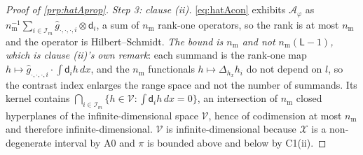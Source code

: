 \begin{proof}[Proof of \cref{prp:hatAprop}]
\emph{Step 3: clause (ii).} \eqref{eq:hatAcon} exhibits $\hat{\mathcal A}_\varphi$ as
$n_{\mathrm m}^{-1}\sum_{i\in\mathcal I_m}\hat g_{\cdot,\cdot,\cdot,i}\otimes\mathsf d_i$, a sum of
$n_{\mathrm m}$ rank-one operators, so the rank is at most $n_{\mathrm m}$ and the operator is
Hilbert--Schmidt. \emph{The bound is $n_{\mathrm m}$ and not $n_{\mathrm m}(\mathsf L-1)$, which is
clause \textup{(ii)}'s own remark}: each summand is the rank-one map
$h\mapsto\hat g_{\cdot,\cdot,\cdot,i}\cdot\int\mathsf d_ih\,dx$, and the $n_{\mathrm m}$ functionals
$h\mapsto\Delta_{h_x}h_i$ do not depend on $l$, so the contrast index enlarges the range space and not
the number of summands. Its kernel contains $\bigcap_{i\in\mathcal I_m}\{h\in\mathcal V:\int\mathsf d_ih\,dx=0\}$,
an intersection of $n_{\mathrm m}$ closed hyperplanes of the infinite-dimensional space $\mathcal V$,
hence of codimension at most $n_{\mathrm m}$ and therefore infinite-dimensional.
$\mathcal V$ is infinite-dimensional because $\mathcal X$ is a non-degenerate interval by A0 and
$\pi$ is bounded above and below by C1(ii).


\end{proof}
